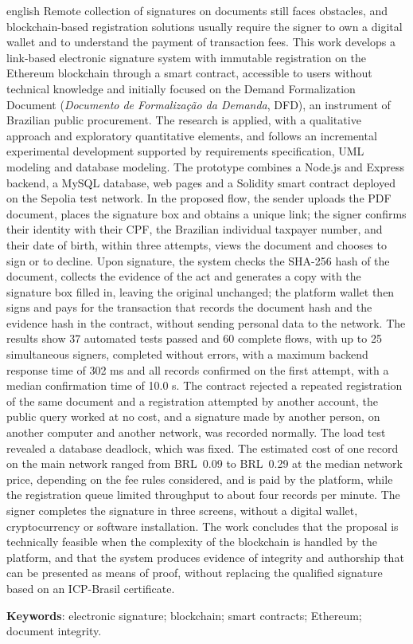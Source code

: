 \documentclass[
    12pt,
    a4paper,
    oneside,
    chapter=TITLE,
    section=TITLE,
    subsection=TITLE,
    subsubsection=TITLE,
    sumario=tradicional,
    english,
    brazil
]{abntex2}
\begin{document}
\begin{resumo}[Abstract]
\begin{otherlanguage*}{english}
Remote collection of signatures on documents still faces obstacles, and blockchain-based registration solutions usually require the signer to own a digital wallet and to understand the payment of transaction fees. This work develops a link-based electronic signature system with immutable registration on the Ethereum blockchain through a smart contract, accessible to users without technical knowledge and initially focused on the Demand Formalization Document (\emph{Documento de Formalização da Demanda}, DFD), an instrument of Brazilian public procurement. The research is applied, with a qualitative approach and exploratory quantitative elements, and follows an incremental experimental development supported by requirements specification, UML modeling and database modeling. The prototype combines a Node.js and Express backend, a MySQL database, web pages and a Solidity smart contract deployed on the Sepolia test network. In the proposed flow, the sender uploads the PDF document, places the signature box and obtains a unique link; the signer confirms their identity with their CPF, the Brazilian individual taxpayer number, and their date of birth, within three attempts, views the document and chooses to sign or to decline. Upon signature, the system checks the SHA-256 hash of the document, collects the evidence of the act and generates a copy with the signature box filled in, leaving the original unchanged; the platform wallet then signs and pays for the transaction that records the document hash and the evidence hash in the contract, without sending personal data to the network. The results show 37 automated tests passed and 60 complete flows, with up to 25 simultaneous signers, completed without errors, with a maximum backend response time of 302 ms and all records confirmed on the first attempt, with a median confirmation time of 10.0 s. The contract rejected a repeated registration of the same document and a registration attempted by another account, the public query worked at no cost, and a signature made by another person, on another computer and another network, was recorded normally. The load test revealed a database deadlock, which was fixed. The estimated cost of one record on the main network ranged from BRL~0.09 to BRL~0.29 at the median network price, depending on the fee rules considered, and is paid by the platform, while the registration queue limited throughput to about four records per minute. The signer completes the signature in three screens, without a digital wallet, cryptocurrency or software installation. The work concludes that the proposal is technically feasible when the complexity of the blockchain is handled by the platform, and that the system produces evidence of integrity and authorship that can be presented as means of proof, without replacing the qualified signature based on an ICP-Brasil certificate.

\textbf{Keywords}: electronic signature; blockchain; smart contracts; Ethereum; document integrity.
\end{otherlanguage*}
\end{resumo}
\end{document}
